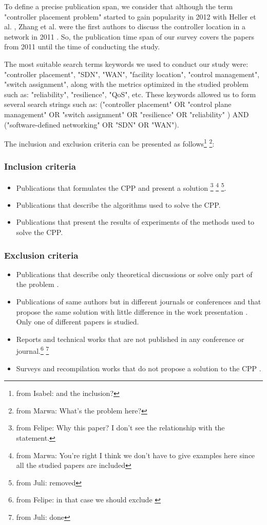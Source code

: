 \documentclass{IEEEtran}
\newcommand\fia[1]{{\color{red}\footnote{\color{red}from Isabel: #1}}} %
\newcommand\dia[1]{{\color{blue}\footnote{\color{blue}from Felipe: #1}}}
\newcommand\mc[1]{{\color{green}\footnote{\color{green}from Marwa: #1}}}
\newcommand\juli[1]{{\color{magenta}\footnote{\color{magenta}from Juli: #1}}}
\newcommand\mia[1]{{\color{red}#1}}%
\newcommand\delia[1]{{\tiny{\color{red}#1}}} %
\begin{document}
To define a precise publication span, we consider that although the term "controller placement problem" started to gain popularity in 2012 with Heller et al. \cite{HeSh12}, Zhang et al. were the first authors to discuss the controller location in a network in 2011 \cite{ZhBe11}. So, the publication time span of our survey covers the papers from 2011 until the time of conducting the study. 

The \delia{most suitable search terms} \mia{keywords} we used to conduct our study were: "controller placement", "SDN", "WAN", "facility location", "control management", "switch assignment", along with the metrics optimized in the studied problem such as: "reliability", "resilience", "QoS", etc. These keywords allowed us to form several search strings such as: ("controller placement" OR "control plane management" OR "switch assignment" OR  "resilience" OR "reliability" ) AND ("software-defined networking" OR "SDN" OR  "WAN"). 

The inclusion and exclusion criteria can be presented as \mia{follows}\fia{and the inclusion?} \mc{What's the problem here?}:


\subsubsection{Inclusion criteria}
\begin{itemize}
    \item Publications that formulates the CPP and present a solution \dia{Why this paper? I don't see the relationship with the statement.} \mc{You're right I think we don't have to give examples here since all the studied papers are included} \juli{removed}.
    \item Publications that describe the algorithms used to solve the CPP.
    \item Publications that present the results of experiments of the methods used to solve the CPP.
\end{itemize}

\subsubsection{Exclusion criteria}
\begin{itemize}
    \item Publications that describe only theoretical discussions or solve only part of the problem \cite{RaMa18, TaBj18, AdAd18, WaLi2017, HoHa14, HoGe14}.
    \item Publications of same authors but in different journals or conferences and that propose the same solution with little difference in the work presentation \cite{SaPu18, HuWa14, 18-JaAh15, KiRa17, HuSi17, 29-SaSt15, HuWa12}. Only one of different papers is studied.
    \item Reports and technical works that are not published in any conference or journal\cite{TaAl17}.\dia{in that case we should exclude \cite{TaAl17}} \juli{done}
    \item Surveys and recompilation works that do not propose a solution to the CPP \cite{HuGu17, KuSr18, SoXi17}.
\end{itemize}
\end{document}
